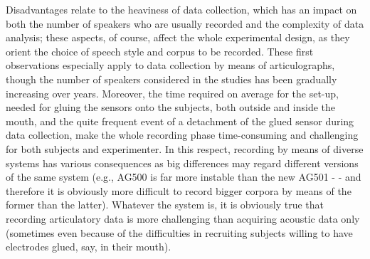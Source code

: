 \documentclass[output=paper]{langsci/langscibook}
\begin{document}
Disadvantages relate to the heaviness of data collection, which has an impact on both the number of speakers who are usually recorded and the complexity of data analysis; these aspects, of course, affect the whole experimental design, as they orient the choice of speech style and corpus to be recorded. These first observations especially apply to data collection by means of articulographs, though the number of speakers considered in the studies has been gradually increasing over years. Moreover, the time required on average for the set-up, needed for gluing the sensors onto the subjects, both outside and inside the mouth, and the quite frequent event of a detachment of the glued sensor during data collection, make the whole recording phase time-consuming and challenging for both subjects and experimenter. In this respect, recording by means of diverse systems has various consequences as big differences may regard different versions of the same system (e.g., AG500 is far more instable than the new AG501 - \citealt{Stella2012,Stella2013} - and therefore it is obviously more difficult to record bigger corpora by means of the former than the latter). Whatever the system is, it is obviously true that recording articulatory data is more challenging than acquiring acoustic data only (sometimes even because of the difficulties in recruiting subjects willing to have electrodes glued, say, in their mouth).\largerpage
\end{document}
